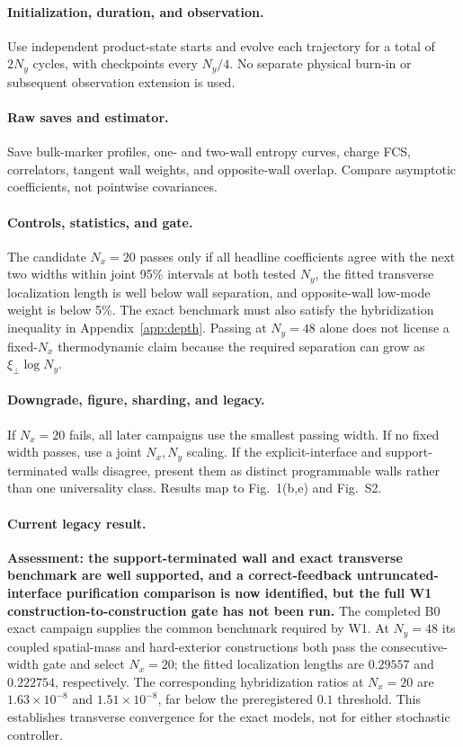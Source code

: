 \documentclass[aps,prx,twocolumn,floatfix,nofootinbib,superscriptaddress,longbibliography]{revtex4-2}
\begin{document}
\paragraph*{Initialization, duration, and observation.}
Use independent product-state starts and evolve each trajectory for a total of $2N_y$
cycles, with checkpoints every $N_y/4$.  No separate physical burn-in or subsequent
observation extension is used.

\paragraph*{Raw saves and estimator.}
Save bulk-marker profiles, one- and two-wall entropy curves, charge FCS, correlators, tangent
wall weights, and opposite-wall overlap.  Compare asymptotic coefficients, not pointwise
covariances.

\paragraph*{Controls, statistics, and gate.}
The candidate $N_x=20$ passes only if all headline coefficients agree with the next two
widths within joint 95\% intervals at both tested $N_y$, the fitted transverse localization
length is well below wall separation, and opposite-wall low-mode weight is below 5\%.
The exact benchmark must also satisfy the hybridization inequality in
Appendix~\ref{app:depth}.  Passing at $N_y=48$ alone does not license a fixed-$N_x$
thermodynamic claim because the required separation can grow as $\xi_\perp\log N_y$.

\paragraph*{Downgrade, figure, sharding, and legacy.}
If $N_x=20$ fails, all later campaigns use the smallest passing width.  If no fixed width
passes, use a joint $N_x,N_y$ scaling.  If the explicit-interface and support-terminated
walls disagree, present them
as distinct programmable walls rather than one universality class.  Results map to
Fig.~1(b,e) and Fig.~S2.

\paragraph*{Current legacy result.}
\textbf{Assessment: the support-terminated wall and exact transverse benchmark are
well supported, and a correct-feedback untruncated-interface purification comparison is
now identified, but the full W1 construction-to-construction gate has not been run.}
The completed B0 exact campaign supplies the common benchmark required by W1.  At
$N_y=48$ its coupled spatial-mass and hard-exterior constructions both pass the
consecutive-width gate and select $N_x=20$; the fitted localization lengths are
$0.29557$ and $0.222754$, respectively.  The corresponding hybridization ratios at
$N_x=20$ are $1.63\times10^{-8}$ and $1.51\times10^{-8}$, far below the preregistered
$0.1$ threshold.  This establishes transverse convergence for the exact models, not for
either stochastic controller.
\end{document}
